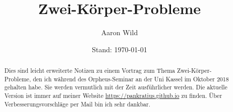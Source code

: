 	\date[]{Stand: \today}
	\title{Zwei-Körper-Probleme}
	\author{Aaron Wild}
	\begin{abstract}
		Dies sind leicht erweiterte Notizen zu einem Vortrag zum Thema Zwei-Körper-Probleme, den ich während des Orpheus-Seminar an der Uni Kassel im Oktober 2018 gehalten habe. Sie werden vermutlich mit der Zeit ausführlicher werden. Die aktuelle Version ist immer auf meiner Website \url{https://pankratius.github.io} zu finden. Über Verbesserungsvorschläge per Mail bin ich sehr dankbar.
	\end{abstract}
	\maketitle




	\tableofcontents
	\makeatletter
